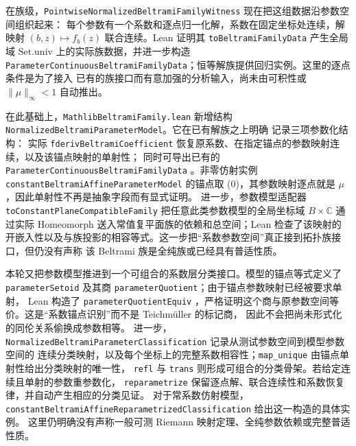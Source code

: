 \documentclass[UTF8,fontset=none,a4paper,11pt]{ctexart}
\begin{document}
在族级，\texttt{PointwiseNormalizedBeltramiFamilyWitness} 现在把这组数据沿参数空间组织起来：
每个参数有一个系数和逐点归一化解，系数在固定坐标处连续，解映射
\((b,z)\mapsto f_b(z)\) 联合连续。Lean 证明其
\texttt{toBeltramiFamilyData} 产生全局域 \(\mathrm{Set.univ}\) 上的实际族数据，并进一步构造
\texttt{ParameterContinuousBeltramiFamilyData}；恒等解族提供回归实例。这里的逐点条件是为了接入
已有的族接口而有意加强的分析输入，尚未由可积性或 \(\|\mu\|_\infty<1\) 自动推出。

在此基础上，\texttt{MathlibBeltramiFamily.lean} 新增结构\linebreak
\texttt{NormalizedBeltramiParameterModel}。它在已有解族之上明确
记录三项参数化结构：
实际 \texttt{fderivBeltramiCoefficient} 恢复原系数、在指定锚点的参数映射连续，以及该锚点映射的单射性；
同时可导出已有的
\texttt{ParameterContinuousBeltramiFamilyData}\linebreak
。非零仿射实例
\texttt{constantBeltramiAffineParameterModel} 的锚点取 (0)，其参数映射逐点就是
\(\mu\)，因此单射性不再是抽象字段而有显式证明。
进一步，参数模型适配器
\texttt{toConstantPlaneCompatibleFamily}\linebreak
把任意此类参数模型的全局坐标域
\(B\times\mathbb C\) 通过实际 Homeomorph 送入常值复平面族的依赖和总空间；Lean 检查了该映射的
开嵌入性以及与族投影的相容等式。这一步把“系数参数空间”真正接到拓扑族接口，但仍没有声称
该 Beltrami 族是全纯族或已经具有普适性质。

本轮又把参数模型推进到一个可组合的系数层分类接口。模型的锚点等式定义了
\texttt{parameterSetoid} 及其商 \texttt{parameterQuotient}；由于锚点参数映射已经被要求单射，
Lean 构造了\linebreak
\texttt{parameterQuotientEquiv}\linebreak
，严格证明这个商与原参数空间等价。这是“系数锚点识别”而不是 Teichmüller 的标记商，
因此不会把尚未形式化的同伦关系偷换成参数相等。
进一步，\linebreak
\texttt{NormalizedBeltramiParameterClassification}\linebreak
记录从测试参数空间到模型参数空间的
连续分类映射，以及每个坐标上的完整系数相容性；\texttt{map\_unique} 由锚点单射性给出分类映射的唯一性，
\texttt{refl} 与 \texttt{trans} 则形成可组合的分类骨架。若给定连续且单射的参数重参数化，
\texttt{reparametrize} 保留逐点解、联合连续性和系数恢复律，并自动产生相应的分类见证。
对于常系数仿射模型，\linebreak
\texttt{constantBeltramiAffineReparametrizedClassification}\linebreak
给出这一构造的具体实例。
这里仍明确没有声称一般可测 Riemann 映射定理、全纯参数依赖或完整普适性质。
\end{document}
